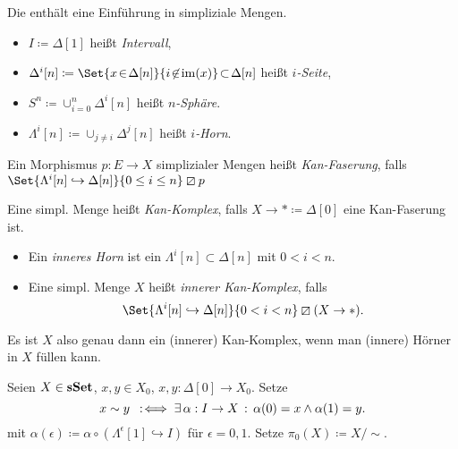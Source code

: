 \documentclass{cheat-sheet}
\newcommand{\lhhe}{\boxslash} %
\begin{document}
\begin{referenz}
  Die  enthält eine Einführung in simpliziale Mengen.
\end{referenz}


\begin{bspe}
  \begin{itemize}
    \item $I \coloneqq \Delta[1]$ heißt \emph{Intervall},
    \item $\Delta^i[n] \coloneqq \Set{x \!\in\! \Delta[n]}{i \!\not\in\! \im(x)} \!\subset\! \Delta[n]$ heißt \emph{$i$-Seite},
    \item $S^n \coloneqq \cup_{i=0}^n \Delta^i[n]$ heißt \emph{$n$-Sphäre}.
    \item $\Lambda^i[n] \coloneqq \cup_{j \neq i} \Delta^j[n]$ heißt \emph{$i$-Horn}.
  \end{itemize}
\end{bspe}

\begin{defn}
  Ein Morphismus $p : E \to X$ simplizialer Mengen heißt \emph{Kan-Faserung}, falls $\Set{\Lambda^i[n] \hookrightarrow \Delta[n]}{0 \leq i \leq n} \lhhe p$
\end{defn}

\begin{defn}
  Eine simpl. Menge heißt \emph{Kan-Komplex}, falls $X \to * \coloneqq \Delta[0]$ eine Kan-Faserung ist.
\end{defn}

\begin{defn}
  \begin{itemize}
    \item Ein \emph{inneres Horn} ist ein $\Lambda^i[n] \subset \Delta[n]$ mit $0 \!<\! i \!<\! n$.
    \item Eine simpl. Menge $X$ heißt \emph{innerer Kan-Komplex}, falls
    \[ \Set{\Lambda^i[n] \hookrightarrow \Delta[n]}{0 < i < n} \lhhe (X \to *). \]
  \end{itemize}
\end{defn}

\begin{bem}
  Es ist $X$ also genau dann ein (innerer) Kan-Komplex, wenn man (innere) Hörner in $X$ füllen kann.
\end{bem}

\begin{defn}
  Seien $X \in \mathbf{sSet}$, $x, y \in X_0$, \dh{} $x, y : \Delta[0] \to X_0$.
  Setze
  \[ x \sim y \enspace:\!\iff \exists \, {\alpha : I \to X} \,:\, \alpha(0)  = x \wedge \alpha(1) = y. \]
  mit $\alpha(\epsilon) \coloneqq \alpha \circ (\Lambda^\epsilon[1] \hookrightarrow I)$ für $\epsilon = 0, 1$. Setze $\pi_0(X) \coloneqq X/{\sim}$.
\end{defn}
\end{document}
